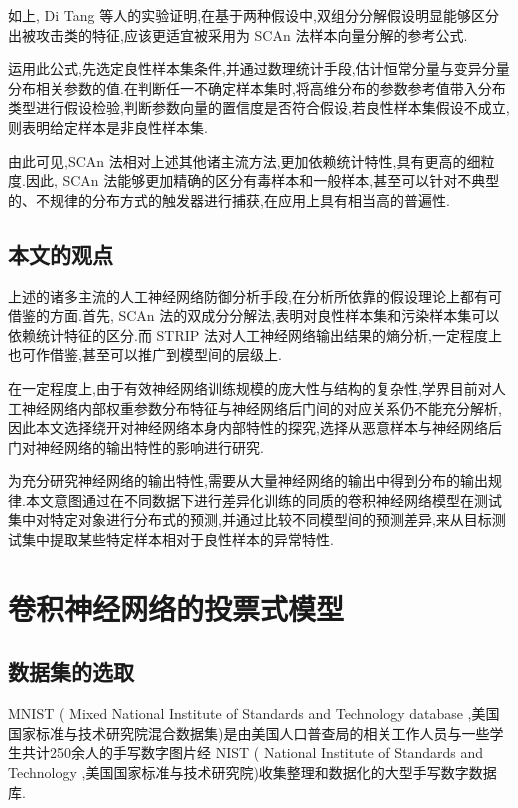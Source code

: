 如上, Di Tang 等人的实验证明,在基于两种假设中,双组分分解假设明显能够区分出被攻击类的特征,应该更适宜被采用为 SCAn 法样本向量分解的参考公式.

运用此公式,先选定良性样本集条件,并通过数理统计手段,估计恒常分量与变异分量分布相关参数的值.在判断任一不确定样本集时,将高维分布的参数参考值带入分布类型进行假设检验,判断参数向量的置信度是否符合假设,若良性样本集假设不成立,则表明给定样本是非良性样本集.

由此可见,SCAn 法相对上述其他诸主流方法,更加依赖统计特性,具有更高的细粒度.因此, SCAn 法能够更加精确的区分有毒样本和一般样本,甚至可以针对不典型的、不规律的分布方式的触发器进行捕获,在应用上具有相当高的普遍性.

\section{本文的观点}

上述的诸多主流的人工神经网络防御分析手段,在分析所依靠的假设理论上都有可借鉴的方面.首先, SCAn 法的双成分分解法,表明对良性样本集和污染样本集可以依赖统计特征的区分.而 STRIP 法对人工神经网络输出结果的熵分析,一定程度上也可作借鉴,甚至可以推广到模型间的层级上.

在一定程度上,由于有效神经网络训练规模的庞大性与结构的复杂性,学界目前对人工神经网络内部权重参数分布特征与神经网络后门间的对应关系仍不能充分解析,因此本文选择绕开对神经网络本身内部特性的探究,选择从恶意样本与神经网络后门对神经网络的输出特性的影响进行研究.

为充分研究神经网络的输出特性,需要从大量神经网络的输出中得到分布的输出规律.本文意图通过在不同数据下进行差异化训练的同质的卷积神经网络模型在测试集中对特定对象进行分布式的预测,并通过比较不同模型间的预测差异,来从目标测试集中提取某些特定样本相对于良性样本的异常特性.

\chapter{卷积神经网络的投票式模型}

\section{数据集的选取}

MNIST ( Mixed National Institute of Standards and Technology database ,美国国家标准与技术研究院混合数据集)是由美国人口普查局的相关工作人员与一些学生共计250余人的手写数字图片经 NIST ( National Institute of Standards and Technology ,美国国家标准与技术研究院)收集整理和数据化的大型手写数字数据库.


